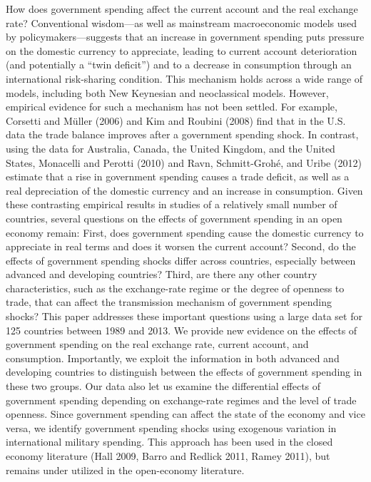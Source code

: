 \documentclass{ZJSUthesis}
\begin{document}
How does government spending affect the current account and the real exchange rate? Conventional
wisdom—as well as mainstream macroeconomic models used by policymakers—suggests that
an increase in government spending puts pressure on the domestic currency to appreciate, leading
to current account deterioration (and potentially a “twin deficit”) and to a decrease in consumption
through an international risk-sharing condition. This mechanism holds across a wide range
of models, including both New Keynesian and neoclassical models. However, empirical evidence
for such a mechanism has not been settled. For example, Corsetti and Müller (2006) and Kim and
Roubini (2008) find that in the U.S. data the trade balance improves after a government spending
shock. In contrast, using the data for Australia, Canada, the United Kingdom, and the United States,
Monacelli and Perotti (2010) and Ravn, Schmitt-Grohé, and Uribe (2012) estimate that a rise in
government spending causes a trade deficit, as well as a real depreciation of the domestic currency
and an increase in consumption. Given these contrasting empirical results in studies of a relatively
small number of countries, several questions on the effects of government spending in an open
economy remain: First, does government spending cause the domestic currency to appreciate in
real terms and does it worsen the current account? Second, do the effects of government spending
shocks differ across countries, especially between advanced and developing countries? Third, are
there any other country characteristics, such as the exchange-rate regime or the degree of openness
to trade, that can affect the transmission mechanism of government spending shocks?
This paper addresses these important questions using a large data set for 125 countries between
1989 and 2013. We provide new evidence on the effects of government spending on the real exchange
rate, current account, and consumption. Importantly, we exploit the information in both
advanced and developing countries to distinguish between the effects of government spending in
these two groups. Our data also let us examine the differential effects of government spending
depending on exchange-rate regimes and the level of trade openness. Since government spending
can affect the state of the economy and vice versa, we identify government spending shocks using
exogenous variation in international military spending. This approach has been used in the closed economy
literature (Hall 2009, Barro and Redlick 2011, Ramey 2011), but remains under utilized
in the open-economy literature.
\end{document}
